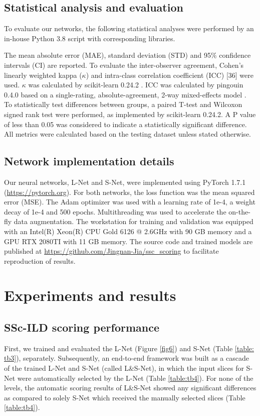 \subsection{Statistical analysis and evaluation}
To evaluate our networks, the following statistical analyses were performed by an in-house Python 3.8 script with corresponding libraries.

The mean absolute error (MAE), standard deviation (STD) and 95\% confidence intervals (CI) are reported. To evaluate the inter-observer agreement, Cohen’s linearly weighted kappa ($\kappa$) \cite{Koo2016} and intra-class correlation coefficient (ICC) [36] were used. $\kappa$ was calculated by scikit-learn 0.24.2 \cite{Pedregosa2011}. ICC was calculated by pingouin 0.4.0 \cite{Vallat2018} based on a single-rating, absolute-agreement, 2-way mixed-effects model \cite{Koo2016}. To statistically test differences between groups, a paired T-test and Wilcoxon signed rank test were performed, as implemented by scikit-learn 0.24.2. A P value of less than 0.05 was considered to indicate a statistically significant difference. All metrics were calculated based on the testing dataset unless stated otherwise.

\subsection{Network implementation details}
Our neural networks, L-Net and S-Net, were implemented using PyTorch 1.7.1 (\url{https://pytorch.org}). For both networks, the loss function was the mean squared error (MSE). The Adam optimizer was used with a learning rate of 1e-4, a weight decay of 1e-4 and 500 epochs. Multithreading was used to accelerate the on-the-fly data augmentation. The workstation for training and validation was equipped with an Intel(R) Xeon(R) CPU Gold 6126 @ 2.6GHz with 90 GB memory and a GPU RTX 2080TI with 11 GB memory. The source code and trained models are published at \url{https://github.com/Jingnan-Jia/ssc_scoring} to facilitate  reproduction of results.


\section{Experiments and results}

\subsection{SSc-ILD scoring performance}
First, we trained and evaluated the L-Net (Figure \ref{fig6}) and S-Net (Table \ref{table: tb3}), separately. Subsequently, an end-to-end framework was built as a cascade of the trained L-Net and S-Net (called L\&S-Net), in which the input slices for S-Net were automatically selected by the L-Net (Table \ref{table:tb4}). For none of the levels, the automatic scoring results of L\&S-Net showed any significant differences as compared to solely S-Net which received the manually selected slices (Table \ref{table:tb4}).


